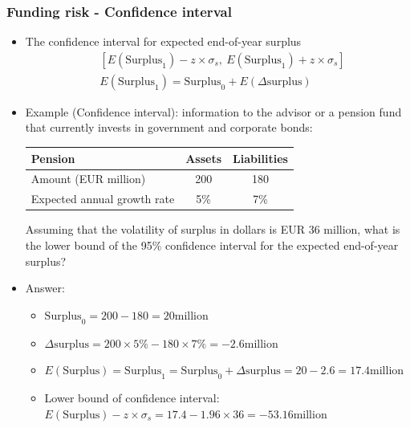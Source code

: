 \subsubsection{Funding risk - Confidence interval}
\begin{itemize}
\item The confidence interval for expected end-of-year surplus
\begin{align*}
&[E(\text{Surplus}_1) - z \times \sigma_s, \ E(\text{Surplus}_1) + z \times \sigma_s] \\
&E(\text{Surplus}_1) = \text{Surplus}_0 + E(\Delta \text{surplus})
\end{align*}

\item Example (Confidence interval): information to the advisor or a pension fund that currently invests in government and corporate bonds:

\begin{tabular}{lcc}
    \toprule
    Pension & Assets & Liabilities \\
    \midrule
    Amount (EUR million) & 200 & 180 \\
    Expected annual growth rate & 5\% & 7\% \\
    \bottomrule
\end{tabular}

Assuming that the volatility of surplus in dollars is EUR 36 million, what is the lower bound of the 95\% confidence interval for the expected end-of-year surplus?

\item Answer:

    \begin{itemize}
    \item $\text{Surplus}_0 = 200 - 180 = 20 \text{million}$
    \item $\Delta \text{surplus} = 200 \times 5\% - 180 \times 7\% = -2.6 \text{million}$
    \item $E(\text{Surplus}) = \text{Surplus}_1 = \text{Surplus}_0 + \Delta \text{surplus} = 20 - 2.6 = 17.4 \text{million}$
    \item Lower bound of confidence interval:
    $E(\text{Surplus}) - z \times \sigma_s = 17.4 - 1.96 \times 36 = -53.16 \text{million}$
    \end{itemize}

\end{itemize}








